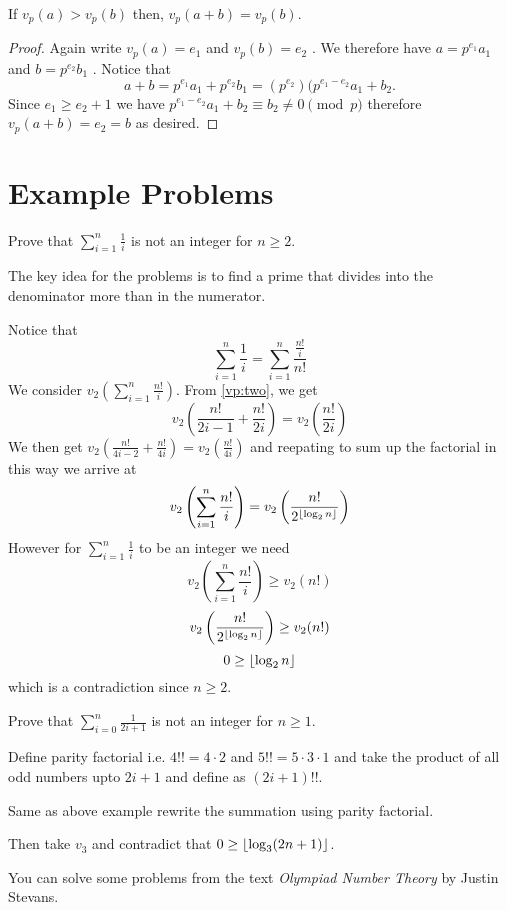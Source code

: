 \begin{theorem}\label{vp:two}
If $v_p(a)>v_p(b)$ then, $v_p(a+b)=v_p(b)$.
\end{theorem}
\begin{proof}
Again write $v_p (a) = e_1$ and $v_p (b) = e_2$ . We therefore have $a = p^{e_1}a_1$ and
$b = p^{e_2} b_1$ . Notice that
\[ a + b = p^{e_1} a_1 + p^{e_2} b_1 = (p^{e_2} ) (p^{e_1 -e_2} a_1 + b_2.\]
Since $e_1 \ge e_2 + 1$ we have $p^{e_1 -e_2} a_1 + b_2 \equiv b_2 \neq 0 \pmod p$ therefore $v_p (a + b) =
e_2 = b$ as desired.
\end{proof}

\section{Example Problems}
\begin{example}
Prove that $\sum_{i=1} ^{n} \frac{1}{i} $ is not an integer for $n\ge 2$.
\end{example}
The key idea for the problems is to find a prime that divides into the
denominator more than in the numerator.

Notice that 
\[ \sum_{i=1}^n \frac{1}{i}=\sum_{i=1}^n \frac{\frac{n!}{i}}{n!}\]
We consider \(v_2\left(\sum_{i=1}^n \frac{n!}{i}\right)\). From \autoref{vp:two}, we get
\[v_2\left( \frac{n!}{2i-1} + \frac{n!}{2i} \right)=v_2\left( \frac{n!}{2i}  \right)\]
We then get $v_2 (\frac{n!}{4i-2} + \frac{n!}{4i})=v_2(\frac{n!}{4i})$ and reepating to sum up the factorial in this way we arrive at
\[v_2\left(\sum_{i=1}^n \frac{n!}{i}\right) =v_2 \left(\frac{n!}{2^{\left\lfloor \log_2 n \right\rfloor}} \right)\]
However for \(\sum_{i=1}^n \frac{1}{i}\) to be an integer we need 
\[v_2\left(\sum_{i=1}^n \frac{n!}{i}\right) \ge v_2(n!)\]
\[v_2 \left(\frac{n!}{2^{\left\lfloor \log_2 n \right\rfloor}} \right) \ge v_2(n!)\]
\[0\ge \left\lfloor \log_2 n \right\rfloor\]
which is a contradiction since $n\ge 2$.


\begin{example}
Prove that $\sum_{i=0} ^{n} \frac{1}{2i+1}$ is not an integer for $n\ge 1$.
\end{example}
 Define parity factorial i.e. $4!!=4\cdot 2$ and $5!!=5\cdot 3 \cdot 1$ and take the product of all odd numbers upto $2i+1$ and define as $(2i+1)!!$.

Same as above example rewrite the summation using parity factorial.

Then take $v_3$ and contradict that $0\ge \left\lfloor \log_3(2n+1) \right\rfloor$.


You can solve some problems from the text \textit{Olympiad Number Theory} by Justin Stevans.

